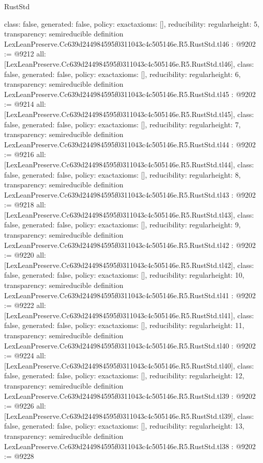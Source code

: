 \begin{lexlean}{RustStd}
\begin{coremodule}
{  class: false,
  generated: false,
  policy: exact{axioms: []},
  reducibility: regular{height: 5},
  transparency: semireducible
}
definition LexLeanPreserve.Cc639d244984595f0311043c4c505146e.R5.RustStd.tl46 : @9202 := @9212 {
  all: [LexLeanPreserve.Cc639d244984595f0311043c4c505146e.R5.RustStd.tl46],
  class: false,
  generated: false,
  policy: exact{axioms: []},
  reducibility: regular{height: 6},
  transparency: semireducible
}
definition LexLeanPreserve.Cc639d244984595f0311043c4c505146e.R5.RustStd.tl45 : @9202 := @9214 {
  all: [LexLeanPreserve.Cc639d244984595f0311043c4c505146e.R5.RustStd.tl45],
  class: false,
  generated: false,
  policy: exact{axioms: []},
  reducibility: regular{height: 7},
  transparency: semireducible
}
definition LexLeanPreserve.Cc639d244984595f0311043c4c505146e.R5.RustStd.tl44 : @9202 := @9216 {
  all: [LexLeanPreserve.Cc639d244984595f0311043c4c505146e.R5.RustStd.tl44],
  class: false,
  generated: false,
  policy: exact{axioms: []},
  reducibility: regular{height: 8},
  transparency: semireducible
}
definition LexLeanPreserve.Cc639d244984595f0311043c4c505146e.R5.RustStd.tl43 : @9202 := @9218 {
  all: [LexLeanPreserve.Cc639d244984595f0311043c4c505146e.R5.RustStd.tl43],
  class: false,
  generated: false,
  policy: exact{axioms: []},
  reducibility: regular{height: 9},
  transparency: semireducible
}
definition LexLeanPreserve.Cc639d244984595f0311043c4c505146e.R5.RustStd.tl42 : @9202 := @9220 {
  all: [LexLeanPreserve.Cc639d244984595f0311043c4c505146e.R5.RustStd.tl42],
  class: false,
  generated: false,
  policy: exact{axioms: []},
  reducibility: regular{height: 10},
  transparency: semireducible
}
definition LexLeanPreserve.Cc639d244984595f0311043c4c505146e.R5.RustStd.tl41 : @9202 := @9222 {
  all: [LexLeanPreserve.Cc639d244984595f0311043c4c505146e.R5.RustStd.tl41],
  class: false,
  generated: false,
  policy: exact{axioms: []},
  reducibility: regular{height: 11},
  transparency: semireducible
}
definition LexLeanPreserve.Cc639d244984595f0311043c4c505146e.R5.RustStd.tl40 : @9202 := @9224 {
  all: [LexLeanPreserve.Cc639d244984595f0311043c4c505146e.R5.RustStd.tl40],
  class: false,
  generated: false,
  policy: exact{axioms: []},
  reducibility: regular{height: 12},
  transparency: semireducible
}
definition LexLeanPreserve.Cc639d244984595f0311043c4c505146e.R5.RustStd.tl39 : @9202 := @9226 {
  all: [LexLeanPreserve.Cc639d244984595f0311043c4c505146e.R5.RustStd.tl39],
  class: false,
  generated: false,
  policy: exact{axioms: []},
  reducibility: regular{height: 13},
  transparency: semireducible
}
definition LexLeanPreserve.Cc639d244984595f0311043c4c505146e.R5.RustStd.tl38 : @9202 := @9228 {
}
\end{coremodule}
\end{lexlean}
